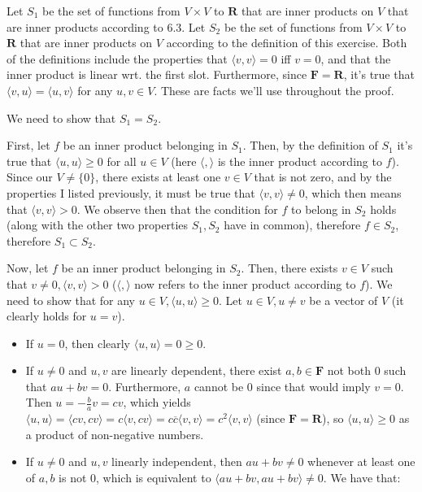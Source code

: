 \begin{solution}

Let $S_1$ be the set of functions from $V \times V$ to $\mathbf{R}$ that are inner products on $V$ that are inner products according to 6.3. Let $S_2$ be the set of functions from $V \times V$ to $\mathbf{R}$ that are inner products on $V$ according to the definition of this exercise. Both of the definitions include the properties that $\langle v, v \rangle = 0$ iff $v = 0$, and that the inner product is linear wrt. the first slot. Furthermore, since $\mathbf{F} = \mathbf{R}$, it's true that $\langle v, u \rangle = \langle u, v \rangle$ for any $u, v \in V$. These are facts we'll use throughout the proof.

We need to show that $S_1 = S_2$. 

First, let $f$ be an inner product belonging in $S_1$. Then, by the definition of $S_1$ it's true that $\langle u, u \rangle \geq 0$ for all $u \in V$ (here $\langle, \rangle$ is the inner product according to $f$). Since our $V \neq \{0\}$, there exists at least one $v \in V$ that is not zero, and by the properties I listed previously, it must be true that $\langle v, v \rangle \neq 0$, which then means that $\langle v, v \rangle > 0$. We observe then that the condition for $f$ to belong in $S_2$ holds (along with the other two properties $S_1, S_2$ have in common), therefore $f \in S_2$, therefore $S_1 \subset S_2$.

Now, let $f$ be an inner product belonging in $S_2$. Then, there exists $v \in V$ such that $v \neq 0, \langle v, v \rangle > 0$ ($\langle, \rangle$ now refers to the inner product according to $f$). We need to show that for any $u \in V, \langle u, u \rangle \geq 0$. 
Let $u \in V, u \neq v$ be a vector of $V$ (it clearly holds for $u = v$).
\begin{itemize}
\item If $u = 0$, then clearly $\langle u, u\rangle = 0 \geq 0$.
\item If $u \neq 0$ and $u, v$ are linearly dependent, there exist $a, b \in \mathbf{F}$ not both 0 such that $au + bv = 0$. Furthermore, $a$ cannot be 0 since that would imply $v = 0$. Then $u = -\frac{b}{a}v = cv$, which yields $\langle u, u \rangle = \langle cv, cv \rangle = c \langle v, cv \rangle = c\overline{c} \langle v, v \rangle = c^2 \langle v, v \rangle$ (since $\mathbf{F} = \mathbf{R}$), so $\langle u, u \rangle \geq 0$ as a product of non-negative numbers.
\item If $u \neq 0$ and $u, v$ linearly independent, then $au + bv \neq 0$ whenever at least one of $a, b$ is not 0, which is equivalent to $\langle au + bv, au + bv \rangle \neq 0$. We have that:


\end{itemize}
\end{solution}

